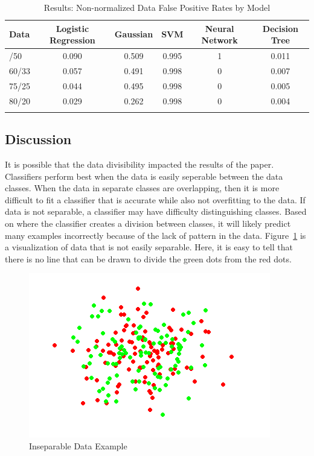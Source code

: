\documentclass[midd]{thesis}
\begin{document}
\begin{table}[htbp]\centering
\def\sym#1{\ifmmode^{#1}\else\(^{#1}\)\fi}
\caption{Results: Non-normalized Data False Positive Rates by Model  \label{tab1}}
\label{tab:fpr}
\scalebox{1} {
\begin{tabular}{l@{\hskip 0.1in} c c c c c} \addlinespace\hline\hline
\addlinespace
Data&Logistic Regression& Gaussian&SVM& Neural Network &Decision Tree\\
\hline

\addlinespace
\addlinespace
50/50	& 0.090 &	0.509	&0.995 &1&	0.011\\
60/33	& 0.057	& 0.491	& 0.998	& 0	& 0.007\\
75/25	& 0.044	& 0.495	& 0.998	& 0	& 0.005\\
80/20	& 0.029	& 0.262	& 0.998	& 0	& 0.004\\
\addlinespace

\hline\hline
\end{tabular}
}
\end{table} 







\subsection{Discussion}

It is possible that the data divisibility impacted the results of the paper. Classifiers perform best when the data is easily seperable between the data classes. When the data in separate classes are overlapping, then it is more difficult to fit a classifier that is accurate while also not overfitting to the data. If data is not separable, a classifier may have difficulty distinguishing classes. Based on where the classifier creates a division between classes, it will likely predict many examples incorrectly because of the lack of pattern in the data. Figure~\ref{fig:inseparable} is a visualization of data that is not easily separable. Here, it is easy to tell that there is no line that can be drawn to divide the green dots from the red dots. 

\begin{figure} \centering
  \includegraphics[scale=.7]{inseparable.png}
  \caption{Inseparable Data Example \cite{inseparable}}
  \label{fig:inseparable}
\end{figure}
\end{document}
